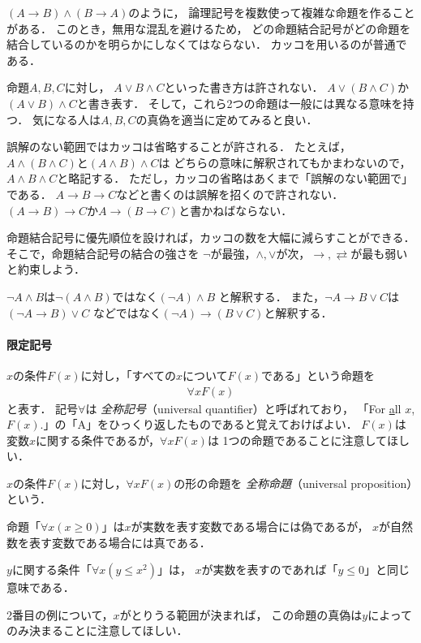  $( A \to B) \land ( B \to A) $のように，
  論理記号を複数使って複雑な命題を作ることがある．
  このとき，無用な混乱を避けるため，
  どの命題結合記号がどの命題を結合しているのかを明らかにしなくてはならない．
  カッコを用いるのが普通である．
  \begin{ex}
    命題$A,  B,  C$に対し，
    $A \lor B \land C$といった書き方は許されない．
    $A \lor ( B \land C)$か$(A \lor B ) \land C$と書き表す．
    そして，これら2つの命題は一般には異なる意味を持つ．
    気になる人は$A,  B,  C$の真偽を適当に定めてみると良い．

    誤解のない範囲ではカッコは省略することが許される．
    たとえば，$A \land ( B \land C)$と$(A \land B)\land C$は
    どちらの意味に解釈されてもかまわないので，$A \land B \land C$と略記する．
    ただし，カッコの省略はあくまで「誤解のない範囲で」である．
    $A \to B \to C$などと書くのは誤解を招くので許されない．
    $( A \to B ) \to C$か$A \to ( B \to C)$と書かねばならない．
  \end{ex}
  
  命題結合記号に優先順位を設ければ，カッコの数を大幅に減らすことができる．
  そこで，命題結合記号の結合の強さを
  $\lnot$が最強，$\land,  \lor$が次，$\to ,  \rightleftarrows$が最も弱い
  と約束しよう．
  \begin{ex}
    $\lnot A \land B$は$\lnot( A \land B)$ではなく$(\lnot A ) \land B$
    と解釈する．
    また，$\lnot A \to B \lor C$は$(\lnot A \to B ) \lor C$
    などではなく$(\lnot A) \to ( B \lor C)$と解釈する．
  \end{ex}

  \paragraph{限定記号}
  $x$の条件$F(x)$に対し，「すべての$x$について$F(x)$である」という命題を
  \begin{align}
    \forall x F(x)
    \label{eq:forall}
  \end{align}
  と表す．
  記号$\forall$は
  \emph{全称記号}（universal quantifier）と呼ばれており，
  「For \underline{a}ll $x$, $F(x)$.」の「A」をひっくり返したものであると覚えておけばよい．
  $F(x)$は変数$x$に関する条件であるが，$\forall x F(x)$は
  1つの命題であることに注意してほしい．

  $x$の条件$F(x)$に対し，$\forall x F(x)$の形の命題を
  \emph{全称命題}（universal proposition）という．
  \begin{ex}
    命題「$\forall x ( x \geq 0 )$」は$x$が実数を表す変数である場合には偽であるが，
    $x$が自然数を表す変数である場合には真である．
  
    $y$に関する条件$「\forall x ( y \leq x^2)$」は，
    $x$が実数を表すのであれば「$ y \leq 0$」と同じ意味である．
  \end{ex}
  2番目の例について，$x$がとりうる範囲が決まれば，
  この命題の真偽は$y$によってのみ決まることに注意してほしい．

